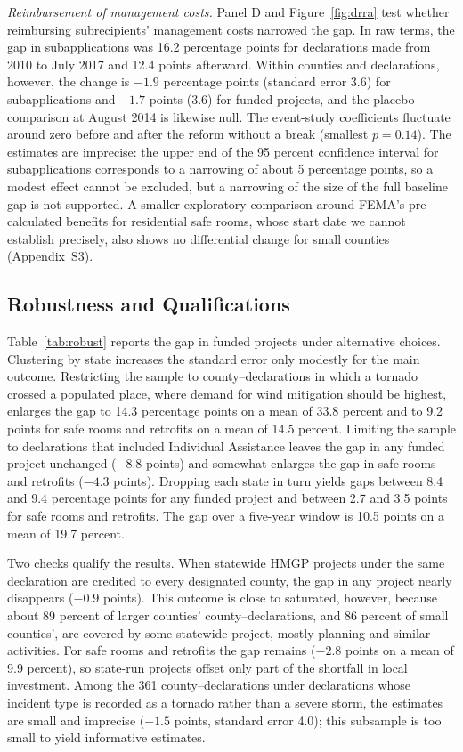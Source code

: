 \textit{Reimbursement of management costs.} Panel D and Figure~\ref{fig:drra} test whether reimbursing subrecipients' management costs narrowed the gap. In raw terms, the gap in subapplications was 16.2 percentage points for declarations made from 2010 to July 2017 and 12.4 points afterward. Within counties and declarations, however, the change is $-1.9$ percentage points (standard error 3.6) for subapplications and $-1.7$ points (3.6) for funded projects, and the placebo comparison at August 2014 is likewise null. The event-study coefficients fluctuate around zero before and after the reform without a break (smallest $p = 0.14$). The estimates are imprecise: the upper end of the 95 percent confidence interval for subapplications corresponds to a narrowing of about 5 percentage points, so a modest effect cannot be excluded, but a narrowing of the size of the full baseline gap is not supported. A smaller exploratory comparison around FEMA's pre-calculated benefits for residential safe rooms, whose start date we cannot establish precisely, also shows no differential change for small counties (Appendix~S3).

\subsection{Robustness and Qualifications}
\label{sec:robustness}

Table~\ref{tab:robust} reports the gap in funded projects under alternative choices. Clustering by state increases the standard error only modestly for the main outcome. Restricting the sample to county--declarations in which a tornado crossed a populated place, where demand for wind mitigation should be highest, enlarges the gap to 14.3 percentage points on a mean of 33.8 percent and to 9.2 points for safe rooms and retrofits on a mean of 14.5 percent. Limiting the sample to declarations that included Individual Assistance leaves the gap in any funded project unchanged ($-8.8$ points) and somewhat enlarges the gap in safe rooms and retrofits ($-4.3$ points). Dropping each state in turn yields gaps between 8.4 and 9.4 percentage points for any funded project and between 2.7 and 3.5 points for safe rooms and retrofits. The gap over a five-year window is 10.5 points on a mean of 19.7 percent.

Two checks qualify the results. When statewide HMGP projects under the same declaration are credited to every designated county, the gap in any project nearly disappears ($-0.9$ points). This outcome is close to saturated, however, because about 89 percent of larger counties' county--declarations, and 86 percent of small counties', are covered by some statewide project, mostly planning and similar activities. For safe rooms and retrofits the gap remains ($-2.8$ points on a mean of 9.9 percent), so state-run projects offset only part of the shortfall in local investment. Among the 361 county--declarations under declarations whose incident type is recorded as a tornado rather than a severe storm, the estimates are small and imprecise ($-1.5$ points, standard error 4.0); this subsample is too small to yield informative estimates.
